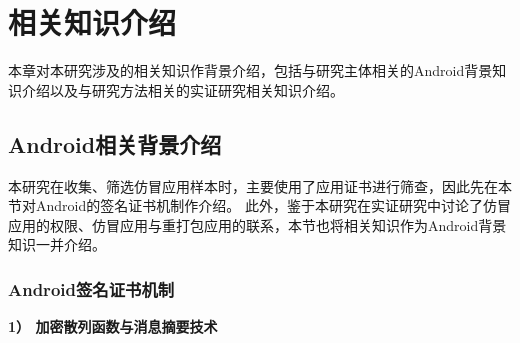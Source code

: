 \chapter{相关知识介绍}
\label{chp:background}
%

本章对本研究涉及的相关知识作背景介绍，包括与研究主体相关的Android背景知识介绍以及与研究方法相关的实证研究相关知识介绍。

\section{Android相关背景介绍}

本研究在收集、筛选仿冒应用样本时，主要使用了应用证书进行筛查，因此先在本节对Android的签名证书机制作介绍。
此外，鉴于本研究在实证研究中讨论了仿冒应用的权限、仿冒应用与重打包应用的联系，本节也将相关知识作为Android背景知识一并介绍。

\subsection{Android签名证书机制}
\label{sec:signature}

\textbf{1） 加密散列函数与消息摘要技术}

